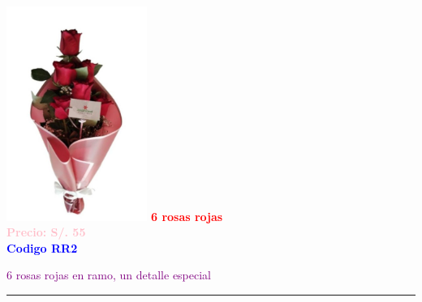 \begin{multicols}{2}
    \begin{minipage}{\linewidth}
        \centering
        \includegraphics[height=7cm]{imagenes_extraidas/image_6_2} %
        \newline
        \vspace{0.1cm}
        \textbf{\Large \textcolor{red}{6 rosas rojas}} \\ %
        \vspace{0.2cm}
        \textbf{\textcolor{pink}{Precio: S/. 55}} \\ %
        \vspace{0.2cm}
        \textbf{\textcolor{blue}{Codigo RR2}} \\ %
        \vspace{0.2cm}
        \begin{minipage}{0.8\linewidth} 
            \small \textcolor{purple}{6 rosas rojas en ramo, un detalle especial} %
        \end{minipage}
        \vspace{0.1cm}        
        \rule{\linewidth}{0.5pt}
    \end{minipage}
    \end{multicols}
\newpage

